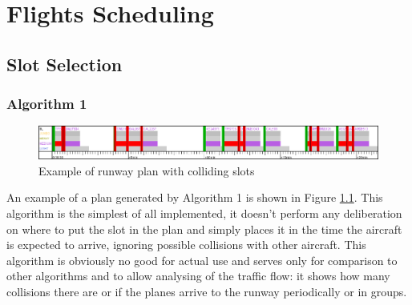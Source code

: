 
\chapter{Flights Scheduling}


\section{Slot Selection}


\subsection{Algorithm 1}

\begin{figure}[h]
    \centering
    \includegraphics[width=\textwidth]{figures/rwy-in-place.png}
    \caption{Example of runway plan with colliding slots}
    \label{fig:rwy-in-place}
\end{figure}

An example of a plan generated by Algorithm 1 is shown in Figure \ref{fig:rwy-in-place}. This algorithm is the simplest of all implemented, it doesn't perform any deliberation on where to put the slot in the plan and simply places it in the time the aircraft is expected to arrive, ignoring possible collisions with other aircraft. This algorithm is obviously no good for actual use and serves only for comparison to other algorithms and to allow analysing of the traffic flow: it shows how many collisions there are or if the planes arrive to the runway periodically or in groups.


